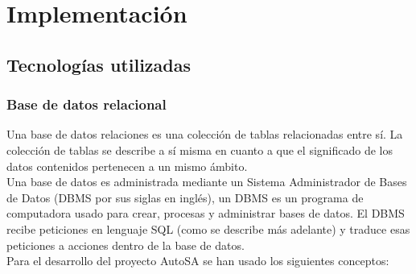 \chapter{Implementación}\label{cap4}

\section{Tecnologías utilizadas}
\subsection{Base de datos relacional}\label{sec:bd-r}
Una base de datos relaciones es una colección de tablas relacionadas entre sí. La colección de tablas se describe a sí misma en cuanto a que el significado de los datos contenidos pertenecen a un mismo ámbito\cite{DataBaseConcepts}.\\
Una base de datos es administrada mediante un Sistema Administrador de Bases de Datos (DBMS por sus siglas en inglés), un DBMS es un programa de computadora usado para crear, procesas y administrar bases de datos. El DBMS recibe peticiones en lenguaje SQL (como se describe más adelante) y traduce esas peticiones a acciones dentro de la base de datos\cite{DataBaseConcepts}.\\
Para el desarrollo del proyecto AutoSA se han usado los siguientes conceptos:
